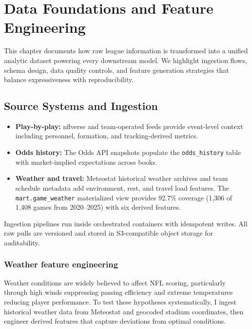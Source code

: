 \chapter{Data Foundations and Feature Engineering}
\label{chap:data}

This chapter documents how raw league information is transformed into a unified analytic dataset powering every downstream model. We highlight ingestion flows, schema design, data quality controls, and feature generation strategies that balance expressiveness with reproducibility.



\section{Source Systems and Ingestion}
\begin{itemize}
  \item \textbf{Play-by-play:} nflverse and team-operated feeds provide event-level context including personnel, formation, and tracking-derived metrics.
  \item \textbf{Odds history:} The Odds API snapshots populate the \texttt{odds\_history} table with market-implied expectations across books.
  \item \textbf{Weather and travel:} Meteostat historical weather archives and team schedule metadata add environment, rest, and travel load features. The \texttt{mart.game\_weather} materialized view provides 92.7\% coverage (1,306 of 1,408 games from 2020--2025) with six derived features.
\end{itemize}
Ingestion pipelines run inside orchestrated containers with idempotent writes. All raw pulls are versioned and stored in S3-compatible object storage for auditability.

\subsection{Weather feature engineering}\label{subsec:weather-features}
Weather conditions are widely believed to affect NFL scoring, particularly through high winds suppressing passing efficiency and extreme temperatures reducing player performance. To test these hypotheses systematically, I ingest historical weather data from Meteostat and geocoded stadium coordinates, then engineer derived features that capture deviations from optimal conditions.

